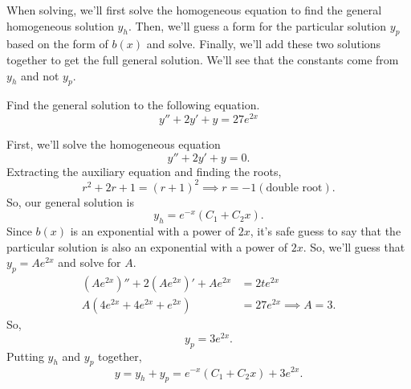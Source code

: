 \noindent
When solving, we'll first solve the homogeneous equation to find the general homogeneous solution $y_h$. Then, we'll guess a form for the particular solution $y_p$ based on the form of $b(x)$ and solve. Finally, we'll add these two solutions together to get the full general solution. We'll see that the constants come from $y_h$ and not $y_p$.

\begin{example}
	Find the general solution to the following equation.
	\begin{equation*}
		y'' + 2y' + y = 27e^{2x}
	\end{equation*}
\end{example}
\noindent
First, we'll solve the homogeneous equation
\begin{equation*}
	y'' + 2y' + y = 0.
\end{equation*}
Extracting the auxiliary equation and finding the roots,
\begin{equation*}
	r^2 + 2r + 1 = \left(r+1\right)^2 \implies r = -1 \left(\text{double root}\right).
\end{equation*}
So, our general solution is
\begin{equation*}
	y_h = e^{-x}\left(C_1 + C_2x\right).
\end{equation*}
Since $b(x)$ is an exponential with a power of $2x$, it's safe guess to say that the particular solution is also an exponential with a power of $2x$. So, we'll guess that $y_p = Ae^{2x}$ and solve for $A$.
\begin{align*}
	\left(Ae^{2x}\right)'' + 2\left(Ae^{2x}\right)' + Ae^{2x} &= 2te^{2x} \\
	A\left(4e^{2x} + 4e^{2x} + e^{2x}\right) &= 27e^{2x} \implies A = 3.
\end{align*}
So,
\begin{equation*}
	y_p = 3e^{2x}.
\end{equation*}
Putting $y_h$ and $y_p$ together,
\begin{equation*}
	y = y_h + y_p = e^{-x}\left(C_1 + C_2x\right) + 3e^{2x}.
\end{equation*}

